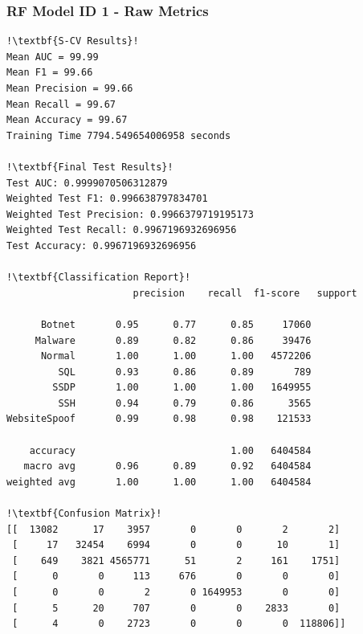 \begin{appendices}
\newpage
\subsubsection{RF Model ID 1 - Raw Metrics}
\begin{lstlisting}[escapechar=!]
!\textbf{S-CV Results}!
Mean AUC = 99.99
Mean F1 = 99.66
Mean Precision = 99.66
Mean Recall = 99.67
Mean Accuracy = 99.67
Training Time 7794.549654006958 seconds

!\textbf{Final Test Results}!
Test AUC: 0.9999070506312879
Weighted Test F1: 0.996638797834701
Weighted Test Precision: 0.9966379719195173
Weighted Test Recall: 0.9967196932696956
Test Accuracy: 0.9967196932696956

!\textbf{Classification Report}!
			          precision    recall  f1-score   support

      Botnet       0.95      0.77      0.85     17060
     Malware       0.89      0.82      0.86     39476
      Normal       1.00      1.00      1.00   4572206
         SQL       0.93      0.86      0.89       789
        SSDP       1.00      1.00      1.00   1649955
         SSH       0.94      0.79      0.86      3565
WebsiteSpoof       0.99      0.98      0.98    121533

    accuracy                           1.00   6404584
   macro avg       0.96      0.89      0.92   6404584
weighted avg       1.00      1.00      1.00   6404584
    
!\textbf{Confusion Matrix}!    
[[  13082      17    3957       0       0       2       2]
 [     17   32454    6994       0       0      10       1]
 [    649    3821 4565771      51       2     161    1751]
 [      0       0     113     676       0       0       0]
 [      0       0       2       0 1649953       0       0]
 [      5      20     707       0       0    2833       0]
 [      4       0    2723       0       0       0  118806]]
\end{lstlisting}


\end{appendices}
